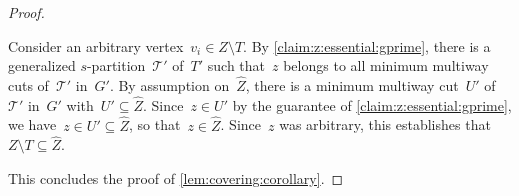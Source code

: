 \begin{proof}
\begin{claimproof}
Consider an arbitrary vertex~$v_i \in Z \setminus T$. By \cref{claim:z:essential:gprime}, there is a generalized $s$-partition~$\mathcal{T}'$ of~$T'$ such that~$z$ belongs to all minimum multiway cuts of~$\mathcal{T}'$ in~$G'$. By assumption on~$\hat{Z}$, there is a minimum multiway cut~$U'$ of~$\mathcal{T}'$ in~$G'$ with~$U' \subseteq \hat{Z}$. Since~$z \in U'$ by the guarantee of \cref{claim:z:essential:gprime}, we have~$z \in U' \subseteq \hat{Z}$, so that~$z \in \hat{Z}$. Since~$z$ was arbitrary, this establishes that~$Z \setminus T \subseteq \hat{Z}$.
\end{claimproof}

This concludes the proof of \cref{lem:covering:corollary}.
%
%

\end{proof}
